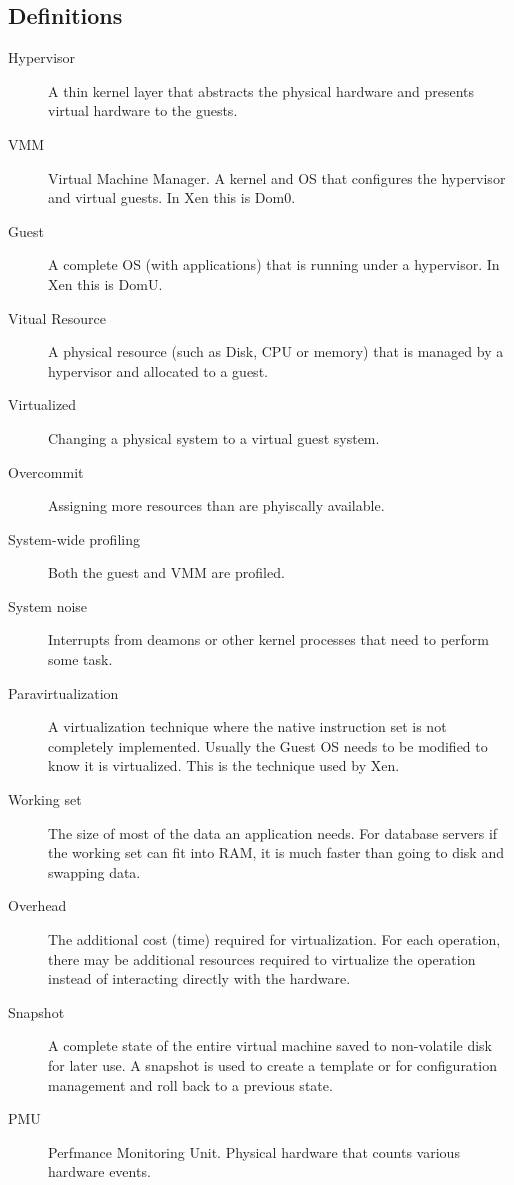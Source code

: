 \subsection{Definitions}
\begin{description}
  \item[Hypervisor] A thin kernel layer that abstracts the physical hardware and presents virtual hardware to the guests.\\
  \item[VMM] Virtual Machine Manager. A kernel and OS that configures the hypervisor and virtual guests.  In Xen this is Dom0.\\
  \item[Guest] A complete OS (with applications) that is running under a hypervisor.  In Xen this is DomU.\\
  \item[Vitual Resource]  A physical resource (such as Disk, CPU or memory) that is managed by a hypervisor and allocated to a guest.\\
  \item[Virtualized] Changing a physical system to a virtual guest system.\\
  \item[Overcommit] Assigning more resources than are phyiscally available.\\
  \item[System-wide profiling] Both the guest and VMM are profiled.\\
  \item[System noise] Interrupts from deamons or other kernel processes that need to perform some task. \cite{tsafrir}\\
  \item[Paravirtualization] A virtualization technique where the native instruction set is not completely implemented.  Usually the Guest OS needs to be modified to know it is virtualized. This is the technique used by Xen. \cite{vmwareMem, du1}
  \item[Working set] The size of most of the data an application needs.  For database servers if the working set can fit into RAM, it is much faster than going to disk and swapping data. 
  \item[Overhead] The additional cost (time) required for virtualization.  For each operation, there may be additional resources required to virtualize the operation instead of interacting directly with the hardware.
  \item[Snapshot] A complete state of the entire virtual machine saved to non-volatile disk for later use.  A snapshot is used to create a template or for configuration management and roll back to a previous state.
  \item[PMU] Perfmance Monitoring Unit.  Physical hardware that counts various hardware events.
\end{description}
